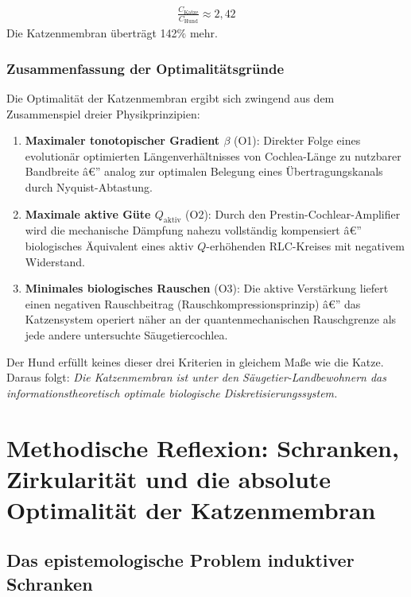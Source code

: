 ﻿\documentclass[12pt,a4paper,titlepage]{report}
\begin{document}
\begin{align}
	\frac{C_{\text{Katze}}}{C_{\text{Hund}}} \approx 2{,}42
\end{align}
Die Katzenmembran überträgt 142$\%$ mehr.

\subsection{Zusammenfassung der Optimalitätsgründe}

Die Optimalität der Katzenmembran ergibt sich zwingend aus dem Zusammenspiel
dreier Physikprinzipien:

\begin{enumerate}[leftmargin=2em, label=\textbf{(P\arabic*)}]
\item \textbf{Maximaler tonotopischer Gradient $\beta$} (O1):
Direkter Folge eines evolutionär optimierten Längenverhältnisses von
Cochlea-Länge zu nutzbarer Bandbreite â€” analog zur
optimalen Belegung eines Übertragungskanals durch Nyquist-Abtastung.
\item \textbf{Maximale aktive Güte $Q_{\text{aktiv}}$} (O2):
Durch den Prestin-Cochlear-Amplifier wird die mechanische Dämpfung
nahezu vollständig kompensiert â€” biologisches Äquivalent eines
aktiv $Q$-erhöhenden RLC-Kreises mit negativem Widerstand.
\item \textbf{Minimales biologisches Rauschen} (O3):
Die aktive Verstärkung liefert einen negativen Rauschbeitrag
(Rauschkompressionsprinzip) â€” das Katzensystem operiert näher
an der quantenmechanischen Rauschgrenze als jede andere untersuchte
Säugetiercochlea.
\end{enumerate}

Der Hund erfüllt keines dieser drei Kriterien in gleichem Maße wie die Katze.
Daraus folgt: \emph{Die Katzenmembran ist unter den Säugetier-Landbewohnern
das informationstheoretisch optimale biologische Diskretisierungssystem.}

\chapter{Methodische Reflexion: Schranken, Zirkularität und die absolute
Optimalität der Katzenmembran}

\section{Das epistemologische Problem induktiver Schranken}
\end{document}
